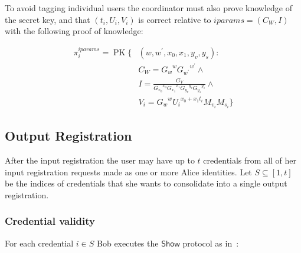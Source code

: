 \documentclass{article}
\begin{document}
To avoid tagging individual users the coordinator must also prove knowledge of the secret key, and that $(t_i, U_i, V_i)$ is correct relative to $\mathit{iparams}=(C_{W}, I)$ with the following proof of knowledge:

\begin{align*}
\pi_{i}^{\mathit{iparams}}=\operatorname{PK}\{ & (w, w^{\prime}, x_{0}, x_{1}, y_v, y_s): \\
&C_{W}={G_{w}}^{w} {G_{w^{\prime}}}^{w^\prime} \land \\
&I=\frac{G_{V}}{{G_{x_{0}}}^{x_0} {G_{x_1}}^{x_1} {G_{y_v}}^{y_v} {G_{y_s}}^{y_s}} \land \\
&V_i={G_w}^{w}{U_i}^{x_{0}+x_{1}t_i} M_{v_i} M_{s_i}
\}
\end{align*}

\subsection{Output Registration}

After the input registration the user may have up to $t$ credentials from all of her input registration requests made as one or more Alice identities.
Let $S \subseteq \left[1,t\right]$ be the indices of credentials that she wants to consolidate into a single output registration.

\subsubsection{Credential validity}

For each credential $i \in S$ Bob executes the $\mathsf{Show}$ protocol as in~\cite{chase2019signal}:
\end{document}

